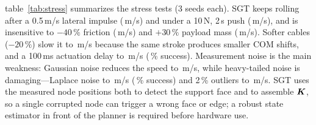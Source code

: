 table~\ref{tab:stress} summarizes the stress
tests (3 seeds each). SGT keeps rolling after a 0.5\,m/s lateral impulse
(\sImpSpeed\,m/s) and under a 10\,N, 2\,s push (\sPushSpeed\,m/s), and
is insensitive to $-40\,\%$ friction (\sFricSpeed\,m/s) and $+30\,\%$
payload mass (\sMassSpeed\,m/s). Softer cables ($-20\,\%$) slow it to
\sStiffSpeed\,m/s because the same stroke produces smaller COM shifts,
and a 100\,ms actuation delay to \sDelaySpeed\,m/s
(\sDelaySuccess\,\% success). Measurement noise is the main weakness:
Gaussian noise reduces the speed to \sGaussSpeed\,m/s, while
heavy-tailed noise is damaging---Laplace noise to \sLapSpeed\,m/s
(\sLapSuccess\,\% success) and 2\,\% outliers to \sOutSpeed\,m/s. SGT uses
the measured node positions both to detect the support face and to
assemble $\boldsymbol{K}$, so a single corrupted node can trigger a wrong face
or edge; a robust state estimator in front of the planner is required
before hardware use.
